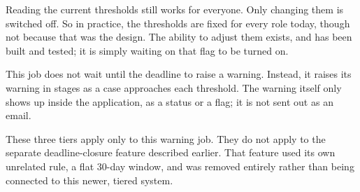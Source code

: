 Reading the current thresholds still works for everyone. Only changing them is switched off. So in practice, the thresholds are fixed for every role today, though not because that was the design. The ability to adjust them exists, and has been built and tested; it is simply waiting on that flag to be turned on.

This job does not wait until the deadline to raise a warning. Instead, it raises its warning in stages as a case approaches each threshold. The warning itself only shows up inside the application, as a status or a flag; it is not sent out as an email.

These three tiers apply only to this warning job. They do not apply to the separate deadline-closure feature described earlier. That feature used its own unrelated rule, a flat 30-day window, and was removed entirely rather than being connected to this newer, tiered system.

